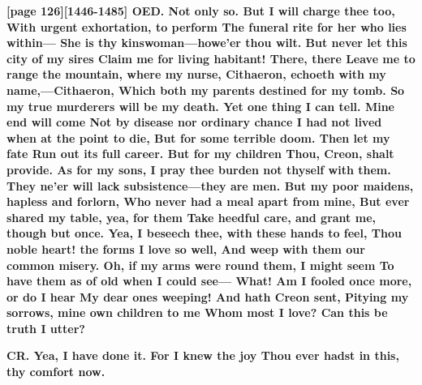 \documentclass[11pt,letter]{book}
\begin{document}
\par \textbf{[page 126][1446-1485] OED. Not only so. But I will charge thee too, With urgent exhortation, to perform The funeral rite for her who lies within— She is thy kinswoman—howe’er thou wilt. But never let this city of my sires Claim me for living habitant! There, there Leave me to range the mountain, where my nurse, Cithaeron, echoeth with my name,—Cithaeron, Which both my parents destined for my tomb. So my true murderers will be my death. Yet one thing I can tell. Mine end will come Not by disease nor ordinary chance I had not lived when at the point to die, But for some terrible doom. Then let my fate Run out its full career. But for my children Thou, Creon, shalt provide. As for my sons, I pray thee burden not thyself with them. They ne’er will lack subsistence—they are men. But my poor maidens, hapless and forlorn, Who never had a meal apart from mine, But ever shared my table, yea, for them Take heedful care, and grant me, though but once. Yea, I beseech thee, with these hands to feel, Thou noble heart! the forms I love so well, And weep with them our common misery. Oh, if my arms were round them, I might seem To have them as of old when I could see— What! Am I fooled once more, or do I hear My dear ones weeping! And hath Creon sent, Pitying my sorrows, mine own children to me Whom most I love? Can this be truth I utter?}
\par 

\par \textbf{CR. Yea, I have done it. For I knew the joy Thou ever hadst in this, thy comfort now.}
\par 
\end{document}
